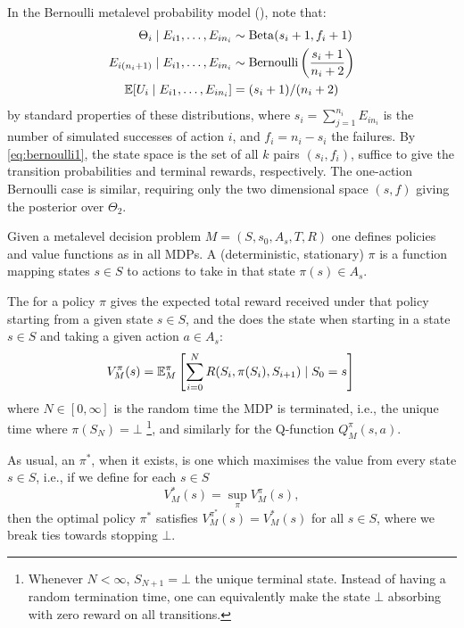 \begin{example}\label{example:bernoulli2}
In the Bernoulli metalevel probability model (),
note that: 
\begin{align}
	\Theta_i \mathrel{|} E_{i1},\dots,E_{in_i} &\sim {\rm Beta}(s_i+1, f_i+1)  \label{eq:bernoulli1}\\
	E_{i(n_i+1)} \mathrel{|} E_{i1},\dots,E_{in_i} &\sim {\rm Bernoulli}\left(\frac{s_i+1}{n_i+2}\right) \label{eq:bernoulli2} \\
	\mathbb{E}[U_i \mathrel{|} E_{i1},\dots,E_{in_i}] &= (s_i+1)/(n_i+2) \label{eq:bernoulli3}
\end{align}
by standard properties of these distributions, where $s_i=\sum_{j=1}^{n_i} E_{in_i}$
is the number of simulated successes of action $i$, and $f_i=n_i-s_i$ the failures.  By \eqref{eq:bernoulli1}, 
the state space is the set of all $k$ pairs $(s_i,f_i)$, 
suffice to give the transition probabilities and terminal rewards, respectively.
The one-action Bernoulli case is similar, requiring only the two dimensional 
space $(s,f)$ giving the posterior over $\Theta_2$.
\end{example}


Given a metalevel decision problem $M=(S,s_0,A_s,T,R)$ one defines policies and 
value functions as in all MDPs.  A (deterministic, stationary)  
$\pi$ is a function mapping states $s\in S$ to actions to take in that state $\pi(s)\in A_s$.	

The  for a policy $\pi$ gives the expected total reward
received under that policy starting from a given state $s\in S$, and the 
does the state when starting in a state $s\in S$ and taking a given action $a\in A_s$: 
\[
	V^\pi_M(s) = \mathbb{E}^\pi_M\left[ \sum_{i=0}^N R(S_i,\pi(S_i),S_{i+1}) \mathrel{|} S_0 = s\right]	\label{eq:value-fn}\\
\]
where $N\in[0,\infty]$ is the random time the MDP is terminated, i.e.,
the unique time where $\pi(S_N)=\bot$%
\footnote{Whenever $N<\infty$, $S_{N+1}=\bot$ the unique terminal state.
Instead of having a random termination time, one can equivalently make
the state $\bot$ absorbing with zero reward on all transitions.}, 
and similarly for the Q-function $Q^\pi_M(s,a)$.

As usual, an  $\pi^*$, when it exists, is one which maximises 
the value from every state $s\in S$, i.e., if we define for each $s\in S$
\[
	V^*_M(s)   = \sup_\pi V^\pi_M(s),
\]
then the optimal policy $\pi^*$ satisfies $V^{\pi^*}_M(s) = V^*_M(s)$
for all $s\in S$, where we break ties towards stopping $\bot$.

